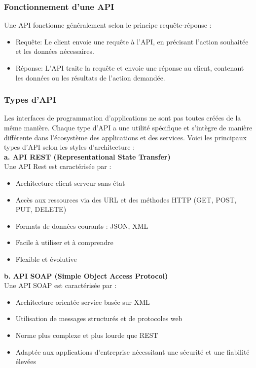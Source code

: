     \subsubsection{Fonctionnement d'une API }
    Une API fonctionne généralement selon le principe requête-réponse : 
    \begin{itemize}
        \item Requête: Le client envoie une requête à l'API, en précisant l'action souhaitée et les données nécessaires. 
        \item Réponse: L'API traite la requête et envoie une réponse au client, contenant les données ou les résultats de l'action demandée.
    \end{itemize} 

    \subsubsection{Types d'API}
    Les interfaces de programmation d’applications ne sont pas toutes créées de la même manière. Chaque type d’API a une utilité spécifique et s’intègre de manière différente dans l’écosystème des applications et des services. Voici les principaux types d'API selon les styles d’architecture : \\
    \textbf{a. API REST (Representational State Transfer) } \\
    Une API Rest est caractérisée par \cite[]{APIRest}:
    \begin{itemize}
        \item Architecture client-serveur sans état
        \item Accès aux ressources via des URL et des méthodes HTTP (GET, POST, PUT, DELETE)
        \item Formats de données courants : JSON, XML
        \item Facile à utiliser et à comprendre
        \item Flexible et évolutive  
    \end{itemize} 
    
    \textbf{b. API SOAP (Simple Object Access Protocol)  } \\
    Une API SOAP est caractérisée par \cite[]{APISOAP}:
    \begin{itemize}
        \item 	Architecture orientée service basée sur XML
        \item Utilisation de messages structurés et de protocoles web
        \item Norme plus complexe et plus lourde que REST
        \item Adaptée aux applications d'entreprise nécessitant une sécurité et une fiabilité élevées   
    \end{itemize} 

